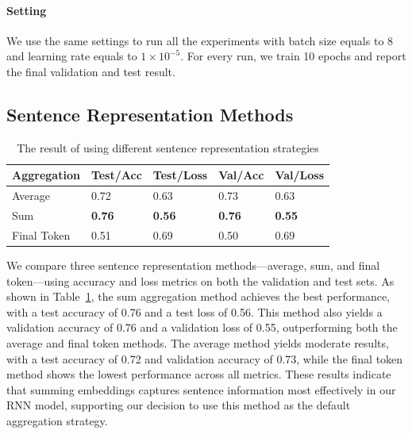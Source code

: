 \paragraph{Setting} We use the same settings to run all the experiments with batch size equals to 8 and learning rate equals to $1 \times 10^{-5}$. For every run, we train 10 epochs and report the final validation and test result.

\subsection{Sentence Representation Methods}

\begin{table}[h]
\centering
\caption{The result of using different sentence representation strategies}
\label{tab:sentence}
\begin{tabular}{l|llll}
\toprule
Aggregation & Test/Acc      & Test/Loss     & Val/Acc       & Val/Loss      \\
\midrule
Average     & 0.72          & 0.63          & 0.73          & 0.63          \\
Sum         & \textbf{0.76} & \textbf{0.56} & \textbf{0.76} & \textbf{0.55} \\
Final Token & 0.51          & 0.69          & 0.50          & 0.69         
\end{tabular}
\end{table}

We compare three sentence representation methods—average, sum, and final token—using accuracy and loss metrics on both the validation and test sets. As shown in Table~\ref{tab:sentence}, the sum aggregation method achieves the best performance, with a test accuracy of 0.76 and a test loss of 0.56. This method also yields a validation accuracy of 0.76 and a validation loss of 0.55, outperforming both the average and final token methods. The average method yields moderate results, with a test accuracy of 0.72 and validation accuracy of 0.73, while the final token method shows the lowest performance across all metrics. These results indicate that summing embeddings captures sentence information most effectively in our RNN model, supporting our decision to use this method as the default aggregation strategy.

